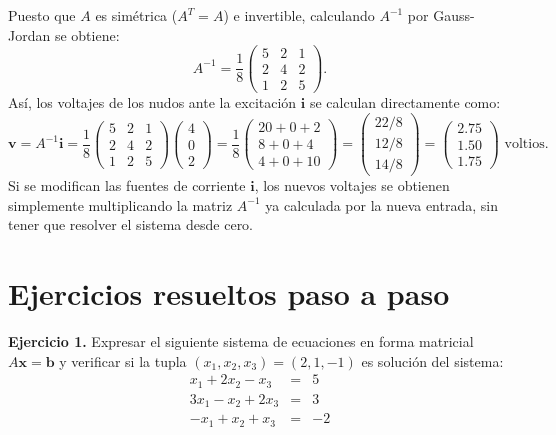 \documentclass[11pt,letterpaper]{article}
\theoremstyle{definition}
\theoremstyle{plain}
\newcommand{\vv}[1]{\mathbf{#1}}
\begin{document}
Puesto que $A$ es simétrica ($A^T=A$) e invertible, calculando $A^{-1}$ por Gauss-Jordan se obtiene:
\[
A^{-1} = \frac{1}{8} \begin{pmatrix} 5 & 2 & 1 \\ 2 & 4 & 2 \\ 1 & 2 & 5 \end{pmatrix}.
\]
Así, los voltajes de los nudos ante la excitación $\vv{i}$ se calculan directamente como:
\[
\vv{v} = A^{-1}\vv{i} = \frac{1}{8} \begin{pmatrix} 5 & 2 & 1 \\ 2 & 4 & 2 \\ 1 & 2 & 5 \end{pmatrix} \begin{pmatrix} 4 \\ 0 \\ 2 \end{pmatrix} = \frac{1}{8} \begin{pmatrix} 20+0+2 \\ 8+0+4 \\ 4+0+10 \end{pmatrix} = \begin{pmatrix} 22/8 \\ 12/8 \\ 14/8 \end{pmatrix} = \begin{pmatrix} 2.75 \\ 1.50 \\ 1.75 \end{pmatrix} \text{ voltios}.
\]
Si se modifican las fuentes de corriente $\vv{i}$, los nuevos voltajes se obtienen simplemente multiplicando la matriz $A^{-1}$ ya calculada por la nueva entrada, sin tener que resolver el sistema desde cero.

\section{Ejercicios resueltos paso a paso}

\textbf{Ejercicio 1.} Expresar el siguiente sistema de ecuaciones en forma matricial $A\vv{x}=\vv{b}$ y verificar si la tupla $(x_1, x_2, x_3) = (2, 1, -1)$ es solución del sistema:
\[
\begin{array}{rcccl}
x_1 + 2x_2 - x_3 &=& 5 \\
3x_1 - x_2 + 2x_3 &=& 3 \\
-x_1 + x_2 + x_3 &=& -2
\end{array}
\]
\end{document}
